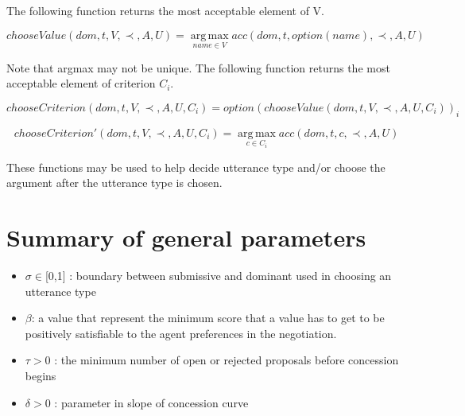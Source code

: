 \documentclass{article}
\begin{document}
	
	The following function returns the most acceptable element of V.

	 $$ chooseValue(dom, t, V, \prec, A, U) =	\operatorname*{arg\,max}_{name \in V} acc(dom, t, option(name), \prec, A, U) $$
	
	Note that argmax may not be unique.  The following function returns the most acceptable element of	criterion $C_i$.
	
	$$chooseCriterion(dom, t, V, \prec, A, U, C_i) = option(chooseValue(dom, t, V, \prec, A, U, C_i))_i$$
	
	
	$$chooseCriterion'(dom, t, V, \prec, A, U, C_i) =	\operatorname*{arg\,max}_{c\in C_i} acc(dom, t, c, \prec, A, U)$$
	
	These functions may be used to help decide utterance type and/or choose the argument after the utterance type is chosen.
	
	\section{Summary of general parameters }
	\begin{itemize}

		\item $\sigma \in $[0,1] : boundary between submissive and dominant used in
				choosing an utterance type
		\item $\beta$:  a value that represent the minimum score that a value has to get to be positively satisfiable to the agent preferences in the negotiation.
		\item $\tau > 0$ : the minimum number of open or rejected proposals before
				concession begins
		\item $\delta > 0$ : parameter in slope of concession curve
		
		
	\end{itemize}

	
%	
%	
%	
	
\end{document}
